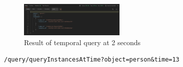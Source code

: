 \documentclass[conference]{IEEEtran}
\begin{document}
\begin{figure}[H]
    \centering
    \includegraphics[width=0.45\textwidth]{10.jpeg}
    \caption{Result of temporal query at 2 seconds}
    \label{fig:query10}
\end{figure}

\begin{minipage}{\linewidth}
\scriptsize
\begin{verbatim}
/query/queryInstancesAtTime?object=person&time=13
\end{verbatim}
\end{minipage}
\end{document}
